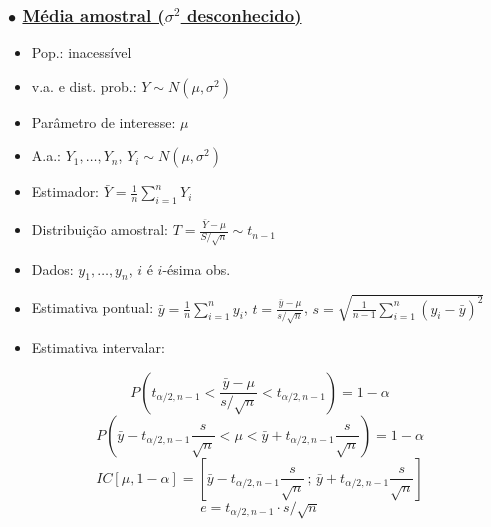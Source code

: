 \documentclass[11pt,a4paper]{article}
\begin{document}
\subsubsection*{$\bullet$ \underline{Média amostral ($\sigma^2$ desconhecido)}}
\begin{itemize}
  \item Pop.: inacessível
  \item v.a. e dist. prob.: $Y \sim N(\mu,\sigma^2)$
  \item Parâmetro de interesse: $\mu$
  \item A.a.: $Y_1,\ldots,Y_n$, $Y_i \sim N(\mu,\sigma^2)$
  \item Estimador: $\displaystyle \bar{Y} = \frac{1}{n}\sum_{i=1}^{n} Y_i$
  \item Distribuição amostral: $\displaystyle T = \frac{\bar{Y}-\mu}{S/\sqrt{n}} \sim t_{n-1}$
  \item Dados: $y_1,\ldots,y_n$, $i$ é $i$-ésima obs.
  \item Estimativa pontual: $\displaystyle \bar{y} = \frac{1}{n}\sum_{i=1}^{n} y_i$, \quad $\displaystyle t = \frac{\bar{y}-\mu}{s/\sqrt{n}}$, \quad $\displaystyle s = \sqrt{\frac{1}{n-1}\sum_{i=1}^{n}(y_i-\bar{y})^2}$
  \item Estimativa intervalar:
\end{itemize}
\[ P\left(t_{\alpha/2,n-1} < \frac{\bar{y}-\mu}{s/\sqrt{n}} < t_{\alpha/2,n-1}\right) = 1-\alpha \]
\[ P\left(\bar{y} - t_{\alpha/2,n-1}\frac{s}{\sqrt{n}} < \mu < \bar{y} + t_{\alpha/2,n-1}\frac{s}{\sqrt{n}}\right) = 1-\alpha \]
\[ IC[\mu,1-\alpha] = \left[\bar{y} - t_{\alpha/2,n-1}\frac{s}{\sqrt{n}}\,;\,\bar{y} + t_{\alpha/2,n-1}\frac{s}{\sqrt{n}}\right] \]
\[ e = t_{\alpha/2,n-1}\cdot s/\sqrt{n} \]

\end{document}
